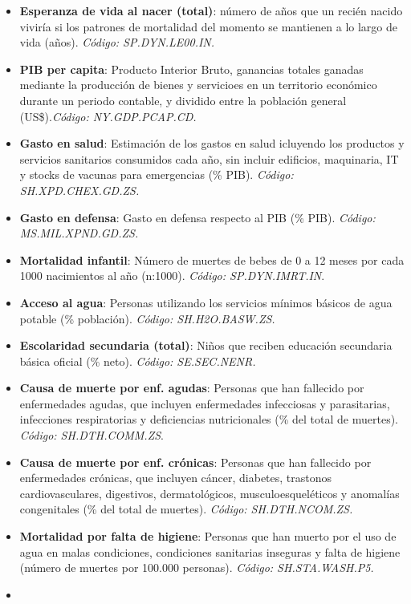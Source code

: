 \documentclass[,article,,moreauthors,pdftex]{Definitions/mdpi}
\begin{document}
\begin{itemize}
\item
  \textbf{Esperanza de vida al nacer (total)}: número de años que un
  recién nacido viviría si los patrones de mortalidad del momento se
  mantienen a lo largo de vida (años). \emph{Código: SP.DYN.LE00.IN.}
\item
  \textbf{PIB per capita}: Producto Interior Bruto, ganancias totales
  ganadas mediante la producción de bienes y servicioes en un territorio
  económico durante un periodo contable, y dividido entre la población
  general (US\$).\emph{Código: NY.GDP.PCAP.CD.}
\item
  \textbf{Gasto en salud}: Estimación de los gastos en salud icluyendo
  los productos y servicios sanitarios consumidos cada año, sin incluir
  edificios, maquinaria, IT y stocks de vacunas para emergencias (\%
  PIB). \emph{Código: SH.XPD.CHEX.GD.ZS.}
\item
  \textbf{Gasto en defensa}: Gasto en defensa respecto al PIB (\% PIB).
  \emph{Código: MS.MIL.XPND.GD.ZS.}
\item
  \textbf{Mortalidad infantil}: Número de muertes de bebes de 0 a 12
  meses por cada 1000 nacimientos al año (n:1000). \emph{Código:
  SP.DYN.IMRT.IN}.
\item
  \textbf{Acceso al agua}: Personas utilizando los servicios mínimos
  básicos de agua potable (\% población). \emph{Código: SH.H2O.BASW.ZS.}
\item
  \textbf{Escolaridad secundaria (total)}: Niños que reciben educación
  secundaria básica oficial (\% neto). \emph{Código: SE.SEC.NENR.}
\item
  \textbf{Causa de muerte por enf. agudas}: Personas que han fallecido
  por enfermedades agudas, que incluyen enfermedades infecciosas y
  parasitarias, infecciones respiratorias y deficiencias nutricionales
  (\% del total de muertes). \emph{Código: SH.DTH.COMM.ZS}.
\item
  \textbf{Causa de muerte por enf. crónicas}: Personas que han fallecido
  por enfermedades crónicas, que incluyen cáncer, diabetes, trastonos
  cardiovasculares, digestivos, dermatológicos, musculoesqueléticos y
  anomalías congenitales (\% del total de muertes). \emph{Código:
  SH.DTH.NCOM.ZS.}
\item
  \textbf{Mortalidad por falta de higiene}: Personas que han muerto por
  el uso de agua en malas condiciones, condiciones sanitarias inseguras
  y falta de higiene (número de muertes por 100.000 personas).
  \emph{Código: SH.STA.WASH.P5.}
\item

\end{itemize}
\end{document}
